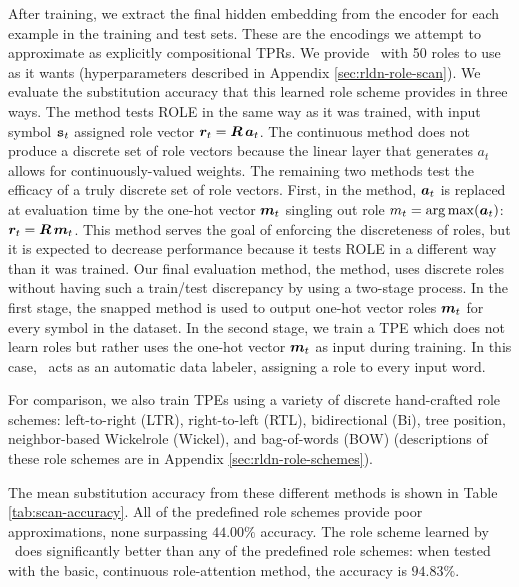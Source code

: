 After training, we extract the final hidden embedding from the encoder for each example in the training and test sets. These are the encodings we attempt to approximate as explicitly compositional TPRs. 
We provide \RLN\ with 50 roles to use as it wants (hyperparameters described in Appendix \ref{sec:rldn-role-scan}).
We evaluate the substitution accuracy that this learned role scheme provides in three ways. The  method tests ROLE in the same way as it was trained, with input symbol ${\mathtt{s}}_t$ assigned role vector ${\bm{r}}_t = {\bm{R}}\, {\bm{a}}_t$. The continuous method does not produce a discrete set of role vectors because the linear layer that generates $a_t$ allows for continuously-valued weights. The remaining two methods test the efficacy of a truly discrete set of role vectors. First, in the  method, ${\bm{a}}_t$ is replaced at evaluation time by the one-hot vector ${\bm{m}}_t$ singling out role $m_t = \operatorname*{arg\,max}({\bm{a}}_t)$: ${\bm{r}}_t = {\bm{R}}\, {\bm{m}}_t$. This method serves the goal of enforcing the discreteness of roles, but it is expected to decrease performance because it tests ROLE in a different way than it was trained. Our final evaluation method, the  method, uses discrete roles without having such a train/test discrepancy by using a two-stage process. In the first stage, the snapped method is used to output one-hot vector roles ${\bm{m}}_t$ for every symbol in the dataset. In the second stage, we train a TPE which does not learn roles but rather uses the one-hot vector ${\bm{m}}_t$ as input during training. In this case, \RLN\ acts as an automatic data labeler, assigning a role to every input word.

For comparison, we also train TPEs using a variety of discrete hand-crafted role schemes: left-to-right (LTR), right-to-left (RTL), bidirectional (Bi), tree position, neighbor-based Wickelrole (Wickel), and bag-of-words (BOW) (descriptions of these role schemes are in Appendix \ref{sec:rldn-role-schemes}). 

The mean substitution accuracy from these different methods is shown in Table \ref{tab:scan-accuracy}. 
All of the predefined role schemes provide poor approximations, none surpassing $44.00\%$ accuracy. 
The role scheme learned by \RLN\ does significantly better than any of the predefined role schemes: when tested with the basic, continuous role-attention method, the accuracy is $94.83\%$. 


